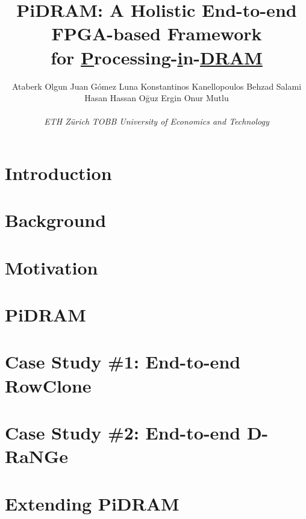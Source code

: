 \documentclass[camera,letterpaper,nomarginnotes,nonarrowgutter]{jpaper}
\title{PiDRAM: A Holistic End-to-end FPGA-based Framework\\for \underline{P}rocessing-\underline{i}n-\underline{DRAM}}
\author{
{Ataberk Olgun\affilETH}\qquad%
{Juan G\'omez Luna\affilETH}\qquad
{Konstantinos Kanellopoulos\affilETH}\qquad
{Behzad Salami\affilETH}\qquad\\
{Hasan Hassan\affilETH}\qquad%
{O\=guz Ergin\affilETU}\qquad%
{Onur Mutlu\affilETH}\qquad\vspace{-3mm}\\\\
{\vspace{-3mm}\affilETH \emph{ETH Z{\"u}rich}} \qquad \affilETU \emph{TOBB University of Economics and Technology}%
}
\newcommand\X[0]{PiDRAM\xspace}
\begin{document}
\maketitle

\thispagestyle{plain}
\pagestyle{plain}

\begin{abstract}

\end{abstract}


\section{Introduction}


\section{Background}


\section{Motivation}


\section{PiDRAM}


\section{Case Study \#1: End-to-end RowClone}


\section{Case Study \#2: End-to-end D-RaNGe}


%

\section{{Extending PiDRAM}}

\end{document}
